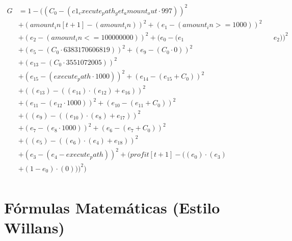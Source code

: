 \documentclass[10pt, a4paper]{article}
\begin{document}
\begin{small}
\begin{align*}
G &= 1 - ((C_{0} - (c1_execute_path_get_amount_out  \cdot  997))^{2} \\
& + (amount_in[t+1] - (amount_in))^{2} + (e_{1} - (amount_in >= 1000))^{2} \\
& + (e_{2} - (amount_in <= 100000000))^{2} + (e_{0} - (e_{1} && e_{2}))^{2} \\
& + (e_{5} - (C_{0}  \cdot  6383170606819))^{2} + (e_{9} - (C_{0}  \cdot  0))^{2} \\
& + (e_{13} - (C_{0}  \cdot  3551072005))^{2} \\
& + (e_{15} - (execute_path  \cdot  1000))^{2} + (e_{14} - (e_{15} + C_{0}))^{2} \\
& + ((e_{13}) - ((e_{14})  \cdot  (e_{12}) + e_{16}))^{2} \\
& + (e_{11} - (e_{12}  \cdot  1000))^{2} + (e_{10} - (e_{11} + C_{0}))^{2} \\
& + ((e_{9}) - ((e_{10})  \cdot  (e_{8}) + e_{17}))^{2} \\
& + (e_{7} - (e_{8}  \cdot  1000))^{2} + (e_{6} - (e_{7} + C_{0}))^{2} \\
& + ((e_{5}) - ((e_{6})  \cdot  (e_{4}) + e_{18}))^{2} \\
& + (e_{3} - (e_{4} - execute_path))^{2} + (profit[t+1] - ((e_{0})  \cdot  (e_{3}) \\
& + (1 - e_{0})  \cdot  (0)))^{2}) \\
\end{align*}
\end{small}\part{Fórmulas Matemáticas (Estilo Willans)}
\end{document}
